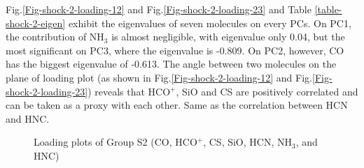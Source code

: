 \documentclass{aa}
\begin{document}
\begin{CJK*}{UTF8}{gbsn}
    Fig.\ref{Fig-shock-2-loading-12} and Fig.\ref{Fig-shock-2-loading-23} and Table \ref{table-shock-2-eigen} exhibit the eigenvalues of seven molecules on every PCs. 
    On PC1, the contribution of NH$_3$ is almost negligible, with eigenvalue only 0.04, but the most significant on PC3, where the eigenvalue is -0.809. 
    On PC2, however, CO has the biggest eigenvalue of -0.613. The angle between two molecules on the plane of loading plot (as shown in Fig.\ref{Fig-shock-2-loading-12} and Fig.\ref{Fig-shock-2-loading-23}) reveals that HCO$^+$, SiO and CS are positively correlated and can be taken as a proxy with each other. 
    Same as the correlation between HCN and HNC.


    \begin{figure}[htp]
        \centering  
        \caption{Loading plots of Group S2 (CO, HCO$^+$, CS, SiO, HCN, NH$_3$, and HNC)}
        \label{Fig-shock-2-loading}
    \end{figure}



\end{CJK*}
\end{document}
